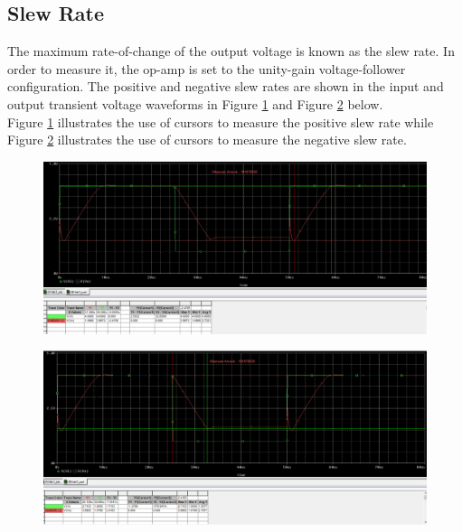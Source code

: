 \documentclass{article}
\begin{document}
	\subsection{Slew Rate}
	The maximum rate-of-change of the output voltage is known as the slew rate. 
	In order to measure it, the op-amp is set to the unity-gain voltage-follower configuration.
	The positive and negative slew rates are shown in the input and output transient voltage waveforms in Figure \ref{f:9} and Figure \ref{f:10} below.\\
	Figure \ref{f:9} illustrates the use of cursors to measure the positive slew rate while Figure \ref{f:10} illustrates the use of cursors to measure the negative slew rate.
	\begin{figure}[!ht]
		\centering
		\includegraphics[width=0.7\textheight]{2.2.png}
		\label{f:9}
	\end{figure}
	\begin{figure}[!ht]
		\centering
		\includegraphics[width=0.7\textheight]{2.1.png}
		\label{f:10}
	\end{figure}
\end{document}

